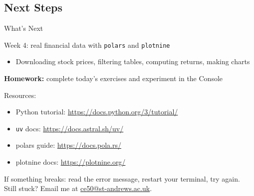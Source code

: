 \documentclass[9pt,aspectratio=169]{beamer}
\begin{document}
\subsection{Next Steps}
\begin{frame}{What's Next}

\bi
    \item Week 4: \alert{real financial data} with \texttt{polars} and \texttt{plotnine}
    \begin{itemize}
        \item Downloading stock prices, filtering tables, computing returns, making charts
    \end{itemize}
    \item \textbf{Homework:} complete today's exercises and experiment in the Console
    \item Resources:
    \begin{itemize}
        \item Python tutorial: \url{https://docs.python.org/3/tutorial/}
        \item \texttt{uv} docs: \url{https://docs.astral.sh/uv/}
        \item polars guide: \url{https://docs.pola.rs/}
        \item plotnine docs: \url{https://plotnine.org/}
    \end{itemize}
\ei

\medskip

\begin{highlightbox}
\centering
If something breaks: read the error message, restart your terminal, try again.\\
Still stuck? Email me at \href{mailto:ce50@st-andrews.ac.uk}{ce50@st-andrews.ac.uk}.
\end{highlightbox}

\end{frame}
\end{document}
